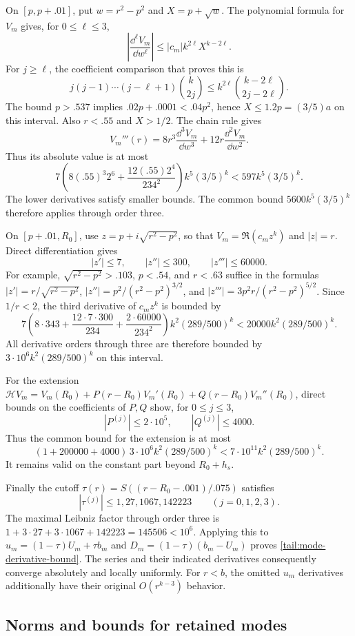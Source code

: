 On $[p,p+.01]$, put $w=r^2-p^2$ and $X=p+\sqrt w$.  The polynomial
formula for $V_m$ gives, for $0\leq\ell\leq3$,
\[
 \left|\frac{\dd^\ell V_m}{\dd w^\ell}\right|
 \leq |c_m| k^{2\ell}X^{k-2\ell}.
\]
For $j\geq\ell$, the coefficient comparison that proves this is
\[
 j(j-1)\cdots(j-\ell+1)\binom{k}{2j}
 \leq k^{2\ell}\binom{k-2\ell}{2j-2\ell}.
\]
The bound $p>.537$ implies
$.02p+.0001<.04p^2$, hence $X\leq1.2p=(3/5)a$ on this interval.
Also $r<.55$ and $X>1/2$.  The chain rule gives
\[
 V_m'''(r)=8r^3\frac{\dd^3V_m}{\dd w^3}
                     +12r\frac{\dd^2V_m}{\dd w^2}.
\]
Thus its absolute value is at most
\[
 7\left(8(.55)^3 2^6+
           \frac{12(.55)2^4}{234^2}\right)k^5(3/5)^k
 <597k^5(3/5)^k.
\]
The lower derivatives satisfy smaller bounds.  The common bound
$5600k^5(3/5)^k$ therefore applies through order three.

On $[p+.01,R_0]$, use $z=p+i\sqrt{r^2-p^2}$, so that
$V_m=\Re(c_mz^k)$ and $|z|=r$.  Direct differentiation gives
\[
 |z'|\leq7,\qquad |z''|\leq300,\qquad |z'''|\leq60000.
\]
For example, $\sqrt{r^2-p^2}>.103$, $p<.54$, and $r<.63$ suffice
in the formulas $|z'|=r/\sqrt{r^2-p^2}$,
$|z''|=p^2/(r^2-p^2)^{3/2}$, and
$|z'''|=3p^2r/(r^2-p^2)^{5/2}$.
Since $1/r<2$, the third derivative of $c_mz^k$ is bounded by
\[
 7\left(8\cdot343+\frac{12\cdot7\cdot300}{234}
                    +\frac{2\cdot60000}{234^2}\right)
 k^2(289/500)^k
 <20000 k^2(289/500)^k.
\]
All derivative orders through three are therefore bounded by
$3\cdot10^6 k^2(289/500)^k$ on this interval.

For the extension
$\mathcal HV_m=V_m(R_0)+P(r-R_0)V_m'(R_0)+Q(r-R_0)V_m''(R_0)$,
direct bounds on the coefficients of $P,Q$ show, for $0\leq j\leq3$,
\[
 |P^{(j)}|\leq2\cdot10^5,\qquad |Q^{(j)}|\leq4000.
\]
Thus the common bound for the extension is at most
\[
 (1+200000+4000)\,3\cdot10^6 k^2(289/500)^k
 <7\cdot10^{11} k^2(289/500)^k.
\]
It remains valid on the constant part beyond $R_0+h_s$.

Finally the cutoff
$\tau(r)=S((r-R_0-.001)/.075)$ satisfies
\[
 |\tau^{(j)}|\leq1,27,1067,142223
 \qquad(j=0,1,2,3).
\]
The maximal Leibniz factor through order three is
$1+3\cdot27+3\cdot1067+142223=145506<10^6$.
Applying this to
$u_m=(1-\tau)U_m+\tau b_m$ and
$D_m=(1-\tau)(b_m-U_m)$ proves
\eqref{tail:mode-derivative-bound}.  The series and their indicated
derivatives consequently converge absolutely and locally uniformly.
For $r<b$, the omitted $u_m$ derivatives additionally have their
original $O(r^{k-3})$ behavior.

\subsection{Norms and bounds for retained modes}
\label{tail:norms}

